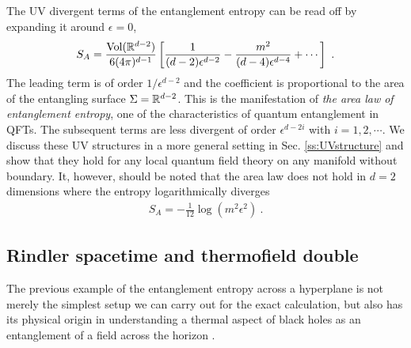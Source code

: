 The UV divergent terms of the entanglement entropy can be read off by expanding it around $\epsilon=0$,
\begin{align}
	S_A = \frac{\text{Vol}(\mathbb{R}^{d-2})}{6(4\pi)^{d-1}}\left[ \frac{1}{(d-2)\epsilon^{d-2}} - \frac{m^2}{(d-4)\epsilon^{d-4}} + \cdots \right] \ .
\end{align}
The leading term is of order $1/\epsilon^{d-2}$ and the coefficient is
proportional to the area of the entangling surface $\Sigma = \mathbb{R}^{d-2}$.
This is the manifestation of \emph{the area law of entanglement entropy}, one of the characteristics of quantum entanglement in QFTs.
The subsequent terms are less divergent of order $\epsilon^{d-2i}$ with $i=1,2,\cdots$.
We discuss these UV structures in a more general setting in Sec. \ref{ss:UVstructure} and show that they hold for any local quantum field theory on any manifold without boundary.
It, however, should be noted that the area law does not hold in $d=2$ dimensions where the entropy logarithmically diverges
\begin{align}
S_A = - \frac{1}{12}\log (m^2 \epsilon^2) \ .
\end{align}



\subsection{Rindler spacetime and thermofield double}\label{ss:RindlerTFD}

The previous example of the entanglement entropy across a hyperplane is not merely the simplest setup we can carry out for the exact calculation, but also has its physical origin in understanding a thermal aspect of black holes as an entanglement of a field across the horizon \cite{Israel:1976ur,Laflamme:1988wg}.

